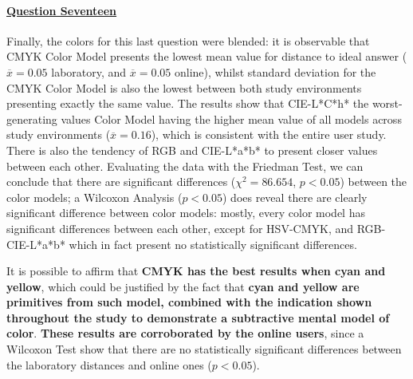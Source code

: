 \paragraph{\ul{Question Seventeen}}
%
Finally, the colors for this last question were blended: it is observable that CMYK Color Model presents the lowest mean value for distance to ideal answer ($\overline{x} = 0.05$
laboratory, and $\overline{x} = 0.05$ online), whilst standard deviation for the CMYK Color Model is also the lowest between both study environments presenting exactly the same value.
The results show that CIE-L*C*h* the worst-generating values Color Model having the higher mean value of all models across study environments ($\overline{x} = 0.16$), which is consistent with the
entire user study. There is also the tendency of RGB and CIE-L*a*b* to present closer values between each other. Evaluating the data with the Friedman Test, we can conclude that there are significant
differences ($\chi^2 = 86.654$, $p < 0.05$) between the color models; a Wilcoxon Analysis ($p < 0.05$) does reveal there are clearly significant difference between color models: mostly, every color model
has significant differences between each other, except for HSV-CMYK, and RGB-CIE-L*a*b* which in fact present no statistically significant differences. \par
%
It is possible to affirm that \textbf{CMYK has the best results when cyan and yellow}, which could be justified by the fact that \textbf{cyan and yellow are primitives from such model, combined with the indication shown throughout the study to demonstrate a subtractive mental model of color}.
\textbf{These results are corroborated by the online users}, since a Wilcoxon Test show that there are no statistically significant differences between the laboratory distances and online ones ($p < 0.05$).
%
